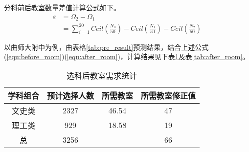 \documentclass[bwprint]{cumcmthesis}
\begin{document}
分科前后教室数量差值计算公式如下。
\begin{align}
\label{equ:distance_room}
\varepsilon &= \Omega_2-\Omega_1\\
&=\sum\limits_{i=1}^{20}Ceil(\frac{N_0}{50})- Ceil(\frac{N_1}{50})-Ceil(\frac{N_2}{50})
\end{align}

以曲师大附中为例，由表格\ref{tab:pre_result}预测结果，结合上述公式(\ref{equ:before_room})(\ref{equ:after_room})，计算结果见下表\ref{tab:brfore_room}及表\ref{tab:after_room}。

\begin{longtable}{cccccc}
	\caption{\label{tab:brfore_room}选科后教室需求统计}\\
	\toprule
	\multicolumn{3}{c}{学科组合} & 预计选择人数 & 所需教室  & 所需教室修正值 \\
	\midrule
	\multicolumn{3}{c}{文史类} & 2327  & 46.54  & 47 \\
	\multicolumn{3}{c}{理工类} & 929   & 18.58  & 19 \\
	\midrule
	\multicolumn{3}{c}{总} & 3256  &       & 66 \\
	\bottomrule
	
\end{longtable}%
\end{document}
